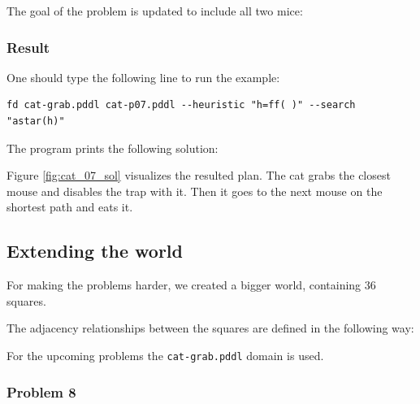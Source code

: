  


The goal of the problem is updated to include all two mice:




\subsubsection{Result}

One should type the following line to run the example: 

\begin{lstlisting}[numbers=none]
fd cat-grab.pddl cat-p07.pddl --heuristic "h=ff( )" --search "astar(h)"
\end{lstlisting}

The program prints the following solution:



Figure \ref{fig:cat_07_sol} visualizes the resulted plan. The cat grabs the closest mouse and disables the trap with it. Then it goes to the next mouse on the shortest path and eats it.







\subsection{Extending the world}

For making the problems harder, we created a bigger world, containing 36 squares. 

The adjacency relationships between the squares are defined in the following way:



For the upcoming problems the \verb|cat-grab.pddl| domain is used.


\subsubsection{Problem 8}

